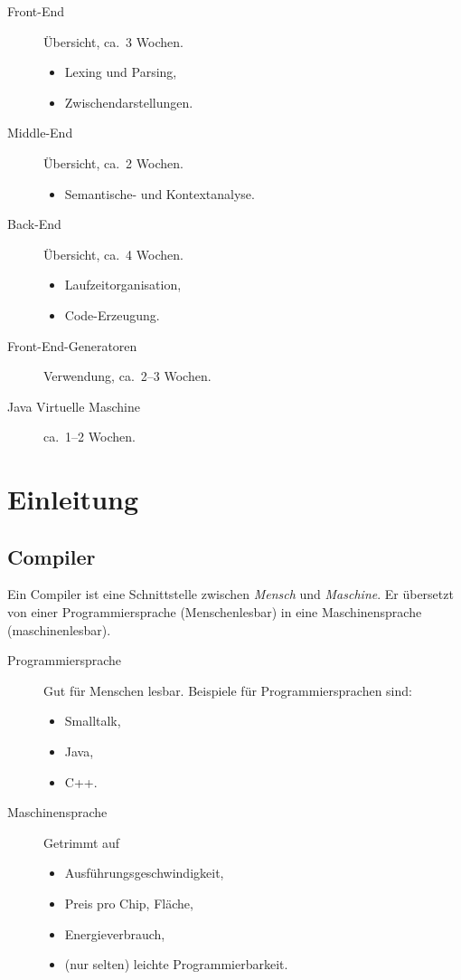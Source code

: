 \documentclass[ngerman]{scrartcl}
\begin{document}
  \begin{description}
    \item[Front-End\footnotemark] Übersicht, ca.\ 3 Wochen.
    \begin{itemize}
      \item Lexing und Parsing,
      \item Zwischendarstellungen.
    \end{itemize}
    \item[Middle-End] Übersicht, ca.\ 2 Wochen.
    \begin{itemize}
      \item Semantische- und Kontextanalyse.
    \end{itemize}
    \item[Back-End] Übersicht, ca.\ 4 Wochen.
    \begin{itemize}
      \item Laufzeitorganisation,
      \item Code-Erzeugung.
    \end{itemize}
    \item[Front-End-Generatoren] Verwendung, ca.\ 2--3 Wochen.
    \item[Java Virtuelle Maschine] ca.\ 1--2 Wochen.
  \end{description}
  
  \section{Einleitung}
  
  \subsection{Compiler}
  
  Ein Compiler ist eine Schnittstelle zwischen \emph{Mensch} und \emph{Maschine}. Er übersetzt von einer Programmiersprache (Menschenlesbar) in eine Maschinensprache (maschinenlesbar).
  
  \begin{description}
    \item[Programmiersprache] Gut für Menschen lesbar. Beispiele für Programmiersprachen sind:
    \begin{itemize}
      \item Smalltalk, 
      \item Java, 
      \item C++.
    \end{itemize}
    \item[Maschinensprache] Getrimmt auf
    \begin{itemize}
      \item Ausführungsgeschwindigkeit,
      \item Preis pro Chip, Fläche,
      \item Energieverbrauch,
      \item (nur selten) leichte Programmierbarkeit.
    \end{itemize}
  \end{description}
  
\end{document}
